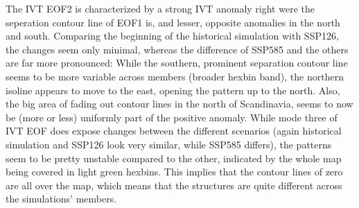 The IVT EOF2 is characterized by a strong IVT anomaly right were the seperation contour line of EOF1 is, and lesser, opposite anomalies in the north and south. 
Comparing the beginning of the historical simulation with SSP126, the changes seem only minimal, whereas the difference of SSP585 and the others are far more pronounced: 
While the southern, prominent separation contour line seems to be more variable across members (broader hexbin band), the northern isoline appears to move to the east, opening the pattern up to the north. 
Also, the big area of fading out contour lines in the north of Scandinavia, seems to now be (more or less) uniformly part of the positive anomaly.  
While mode three of IVT EOF does expose changes between the different scenarios (again historical simulation and SSP126 look very similar, while SSP585 differs), the patterns seem to be pretty unstable compared to the other, indicated by the whole map being covered in light green hexbins. 
This implies that the contour lines of zero are all over the map, which means that the structures are quite different across the simulations' members. 


